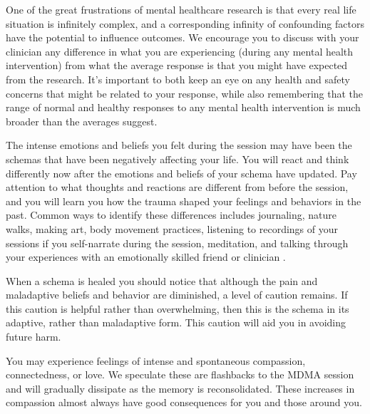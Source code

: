 \documentclass[12pt,letterpaper]{book}
\begin{document}
One of the great frustrations of mental healthcare research is that every real life situation is infinitely complex, and a corresponding infinity of confounding factors have the potential to influence outcomes. We encourage you to discuss with your clinician any difference in what you are experiencing (during any mental health intervention) from what the average response is that you might have expected from the research. It's important to both keep an eye on any health and safety concerns that might be related to your response, while also remembering that the range of normal and healthy responses to any mental health intervention is much broader than the averages suggest.

The intense emotions and beliefs you felt during the session may have been the schemas that have been negatively affecting your life. You will react and think differently now after the emotions and beliefs of your schema have updated. Pay attention to what thoughts and reactions are different from before the session, and you will learn you how the trauma shaped your feelings and behaviors in the past. Common ways to identify these differences includes journaling, nature walks, making art, body movement practices, listening to recordings of your sessions if you self-narrate during the session, meditation, and talking through your experiences with an emotionally skilled friend or clinician \cite{mithoeferManual}.

When a schema is healed you should notice that although the pain and maladaptive beliefs and behavior are diminished, a level of caution remains. If this caution is helpful rather than overwhelming, then this is the schema in its adaptive, rather than maladaptive form. This caution will aid you in avoiding future harm.

You may experience feelings of intense and spontaneous compassion, connectedness, or love. We speculate these are flashbacks to the MDMA session and will gradually dissipate as the memory is reconsolidated. These increases in compassion almost always have good consequences for you and those around you.
\end{document}
